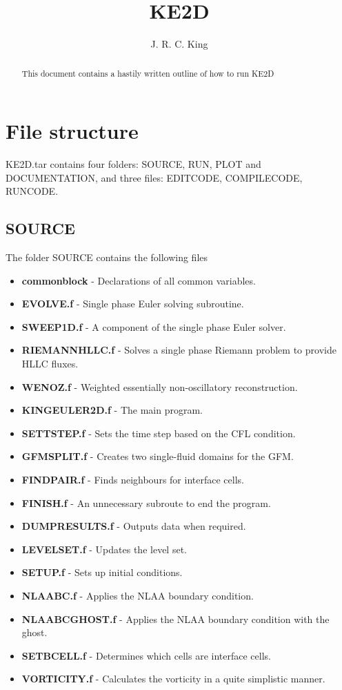 \documentclass{article}
\begin{document}
\title{KE2D}
\author{J. R. C. King}
\maketitle
\begin{abstract}
This document contains a hastily written outline of how to run KE2D
\end{abstract}


\section{File structure}
KE2D.tar contains four folders: SOURCE, RUN, PLOT and DOCUMENTATION, and three files: EDITCODE, COMPILECODE, RUNCODE.

\subsection{SOURCE}
The folder SOURCE contains the following files
\begin{itemize}
\item \textbf{commonblock} - Declarations of all common variables.
\item \textbf{EVOLVE.f} - Single phase Euler solving subroutine.
\item \textbf{SWEEP1D.f} - A component of the single phase Euler solver.
\item \textbf{RIEMANNHLLC.f} - Solves a single phase Riemann problem to provide HLLC fluxes.
\item \textbf{WENOZ.f} - Weighted essentially non-oscillatory reconstruction.
\item \textbf{KINGEULER2D.f} - The main program.
\item \textbf{SETTSTEP.f} - Sets the time step based on the CFL condition.
\item \textbf{GFMSPLIT.f} - Creates two single-fluid domains for the GFM.
\item \textbf{FINDPAIR.f} - Finds neighbours for interface cells.
\item \textbf{FINISH.f} - An unnecessary subroute to end the program.
\item \textbf{DUMPRESULTS.f} - Outputs data when required.
\item \textbf{LEVELSET.f} - Updates the level set.       
\item \textbf{SETUP.f} - Sets up initial conditions.
\item \textbf{NLAABC.f} - Applies the NLAA boundary condition.
\item \textbf{NLAABCGHOST.f} - Applies the NLAA boundary condition with the ghost.
\item \textbf{SETBCELL.f} - Determines which cells are interface cells.
\item \textbf{VORTICITY.f} - Calculates the vorticity in a quite simplistic manner.
\end{itemize}
\end{document}
